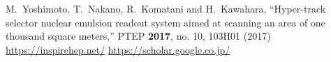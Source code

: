 \documentclass[a4j]{jsarticle}
\begin{document}
\begin{thebibliography}{99}
  M.~Yoshimoto, T.~Nakano, R.~Komatani and H.~Kawahara,
  ``Hyper-track selector nuclear emulsion readout system aimed at scanning an area of one thousand square meters,''
  PTEP {\bf 2017}, no. 10, 103H01 (2017)
\url{https://inspirehep.net/}
\url{https://scholar.google.co.jp/}
\end{thebibliography}
\end{document}
